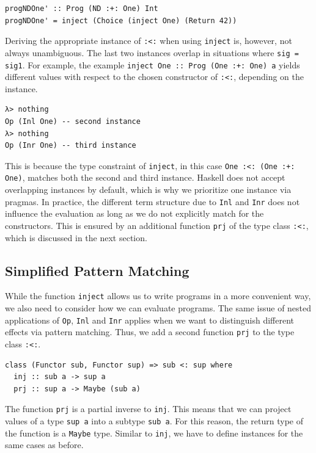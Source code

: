 \documentclass[a4paper, 11pt, fleqn, twoside]{scrreprt}
\newcommand{\hinl}[1]{\texttt{#1}}
\begin{document}
\begin{verbatim}
progNDOne' :: Prog (ND :+: One) Int
progNDOne' = inject (Choice (inject One) (Return 42))
\end{verbatim}

Deriving the appropriate instance of \hinl{:<:} when using \hinl{inject} is, however, not always unambiguous.
The last two instances overlap in situations where \hinl{sig = sig1}.
For example, the example \hinl{inject One :: Prog (One :+: One) a} yields different values with respect to the chosen constructor of \hinl{:<:}, depending on the instance.

\begin{verbatim}
λ> nothing
Op (Inl One) -- second instance
λ> nothing
Op (Inr One) -- third instance
\end{verbatim}

This is because the type constraint of \hinl{inject}, in this case \hinl{One :<: (One :+: One)}, matches both the second and third instance.
Haskell does not accept overlapping instances by default, which is why we prioritize one instance via pragmas.
In practice, the different term structure due to \hinl{Inl} and \hinl{Inr} does not influence the evaluation as long as we do not explicitly match for the constructors.
This is ensured by an additional function \hinl{prj} of the type class \hinl{:<:}, which is discussed in the next section.

\subsection{Simplified Pattern Matching}
While the function \hinl{inject} allows us to write programs in a more convenient way, we also need to consider how we can evaluate programs.
The same issue of nested applications of \hinl{Op}, \hinl{Inl} and \hinl{Inr} applies when we want to distinguish different effects via pattern matching.
Thus, we add a second function \hinl{prj} to the type class \hinl{:<:}.

\begin{verbatim}
class (Functor sub, Functor sup) => sub <: sup where
  inj :: sub a -> sup a
  prj :: sup a -> Maybe (sub a)
\end{verbatim}

The function \hinl{prj} is a partial inverse to \hinl{inj}.
This means that we can project values of a type \hinl{sup a} into a subtype \hinl{sub a}.
For this reason, the return type of the function is a \hinl{Maybe} type.
Similar to \hinl{inj}, we have to define instances for the same cases as before.
\end{document}
